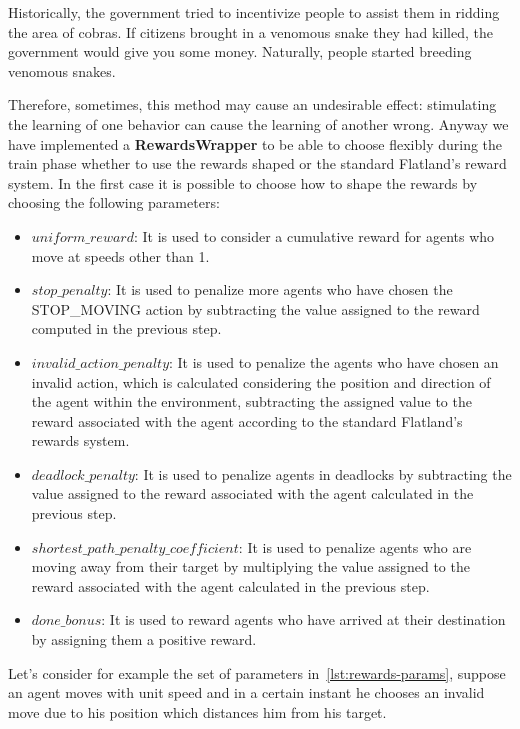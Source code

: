 \documentclass[11pt, a4paper, hidelinks]{report}
\begin{document}
\begin{quoting}[font=itshape, begintext={"}, endtext={ \footnote{https://medium.com/@BonsaiAI/deep-reinforcement-learning-models-tips-tricks-for-writing-reward-functions-a84fe525e8e0}}]
Historically, the government tried to incentivize people to assist them in ridding the area of cobras.
If citizens brought in a venomous snake they had killed, the government would give you some money.
Naturally, people started breeding venomous snakes.
\end{quoting}
Therefore, sometimes, this method may cause an undesirable effect: stimulating the learning of one behavior can cause the learning of another wrong.
Anyway  we have implemented a \textbf{RewardsWrapper} to be able to choose flexibly during the train phase whether to use the rewards shaped or the standard Flatland's reward system.
In the first case it is possible to choose how to shape the rewards by choosing the following parameters:

\begin{itemize}
	\item\textbf{$uniform\_reward$}: It is used to consider a cumulative reward for agents who move at speeds other than 1.
	\item \textbf{$stop\_penalty$}: It is used to penalize more agents who have chosen the STOP\_MOVING action by subtracting the value assigned to the reward computed in the previous step.
	\item \textbf{$invalid\_action\_penalty$}: It is used to penalize the agents who have chosen an invalid action, which is calculated considering the position and direction of the agent within the environment, subtracting the assigned value to the reward associated with the agent according to the standard Flatland's rewards system.
	\item \textbf{$deadlock\_penalty$}: It is used to penalize agents in deadlocks by subtracting the value assigned to the reward associated with the agent calculated in the previous step.
	\item \textbf{$shortest\_path\_penalty\_coefficient$}: It is used to penalize agents who are moving away from their target by multiplying the value assigned to the reward associated with the agent calculated in the previous step.
	\item \textbf{$done\_bonus$}: It is used to reward agents who have arrived at their destination by assigning them a positive reward.
\end{itemize}
Let's consider for example the set of parameters in~\ref{lst:rewards-params}, suppose an agent moves with unit speed and in a certain instant he chooses an invalid move due to his position which distances him from his target.
\end{document}
